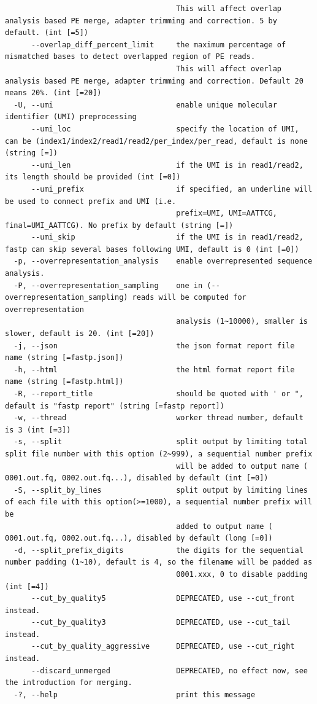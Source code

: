 \documentclass[
  letterpaper,
]{book}
\begin{document}
\begin{verbatim}
                                       This will affect overlap analysis based PE merge, adapter trimming and correction. 5 by default. (int [=5])
      --overlap_diff_percent_limit     the maximum percentage of mismatched bases to detect overlapped region of PE reads.
                                       This will affect overlap analysis based PE merge, adapter trimming and correction. Default 20 means 20%. (int [=20])
  -U, --umi                            enable unique molecular identifier (UMI) preprocessing
      --umi_loc                        specify the location of UMI, can be (index1/index2/read1/read2/per_index/per_read, default is none (string [=])
      --umi_len                        if the UMI is in read1/read2, its length should be provided (int [=0])
      --umi_prefix                     if specified, an underline will be used to connect prefix and UMI (i.e.
                                       prefix=UMI, UMI=AATTCG, final=UMI_AATTCG). No prefix by default (string [=])
      --umi_skip                       if the UMI is in read1/read2, fastp can skip several bases following UMI, default is 0 (int [=0])
  -p, --overrepresentation_analysis    enable overrepresented sequence analysis.
  -P, --overrepresentation_sampling    one in (--overrepresentation_sampling) reads will be computed for overrepresentation
                                       analysis (1~10000), smaller is slower, default is 20. (int [=20])
  -j, --json                           the json format report file name (string [=fastp.json])
  -h, --html                           the html format report file name (string [=fastp.html])
  -R, --report_title                   should be quoted with ' or ", default is "fastp report" (string [=fastp report])
  -w, --thread                         worker thread number, default is 3 (int [=3])
  -s, --split                          split output by limiting total split file number with this option (2~999), a sequential number prefix
                                       will be added to output name ( 0001.out.fq, 0002.out.fq...), disabled by default (int [=0])
  -S, --split_by_lines                 split output by limiting lines of each file with this option(>=1000), a sequential number prefix will be
                                       added to output name ( 0001.out.fq, 0002.out.fq...), disabled by default (long [=0])
  -d, --split_prefix_digits            the digits for the sequential number padding (1~10), default is 4, so the filename will be padded as
                                       0001.xxx, 0 to disable padding (int [=4])
      --cut_by_quality5                DEPRECATED, use --cut_front instead.
      --cut_by_quality3                DEPRECATED, use --cut_tail instead.
      --cut_by_quality_aggressive      DEPRECATED, use --cut_right instead.
      --discard_unmerged               DEPRECATED, no effect now, see the introduction for merging.
  -?, --help                           print this message
\end{verbatim}
\end{document}
